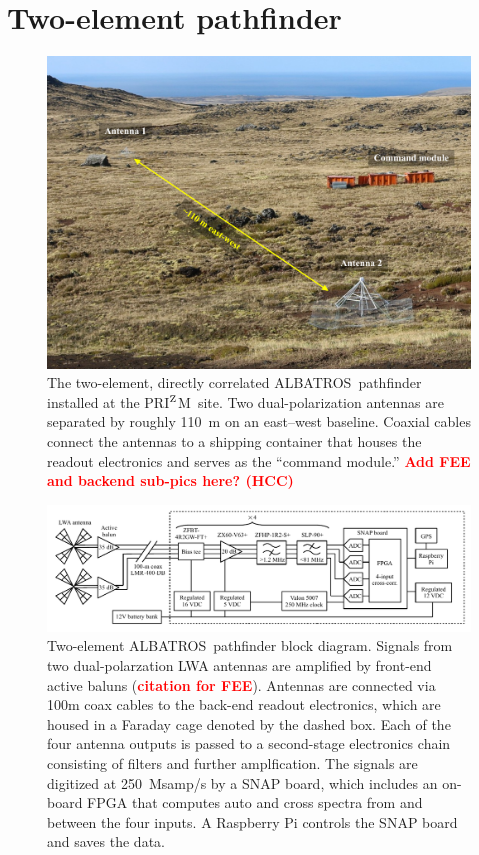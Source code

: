 \documentclass{ws-jai}
\def\albatros{ALBATROS}
\def\prizm{PRI$^{\rm Z}$M}
\newcommand{\attention}[1]{\textcolor{red}{\bf {#1}}}
\begin{document}
\section{Two-element pathfinder}

\begin{figure}
  \begin{center}
    \includegraphics[width=0.7\linewidth]{Figures/albatros_2elem/albatros_2elem.pdf}
    \caption{The two-element, directly correlated
      \albatros\ pathfinder installed at the \prizm\ site.  Two
      dual-polarization antennas are separated by roughly 110~m on an
      east--west baseline. Coaxial cables connect the antennas to a
      shipping container that houses the readout electronics and
      serves as the ``command module.'' \attention{Add FEE
        and backend sub-pics here? (HCC)}}
    \label{Fig:albatros2}
  \end{center}
\end{figure}

\begin{figure}
  \begin{center} \includegraphics[width=1.0\linewidth]{Figures/albatros_2elem_schematic/albatros_2elem_schematic.pdf}
    \caption{Two-element \albatros\ pathfinder block diagram.
      Signals from two dual-polarzation LWA antennas are amplified by
      front-end active baluns (\attention{citation for FEE}).
      Antennas are connected via 100m coax cables to the back-end 
      readout electronics, which are housed in a Faraday cage denoted
      by the dashed box.  Each of the four antenna outputs is passed
      to a second-stage electronics chain consisting of filters and further amplfication.  The signals are
      digitized at 250~Msamp/s by a SNAP board, which includes an on-board FPGA that computes auto and cross spectra
      from and between the four inputs.  A Raspberry Pi controls the SNAP board and
      saves the data.}
    \label{Fig:albatros2_schem}
  \end{center}
\end{figure}
\end{document}
